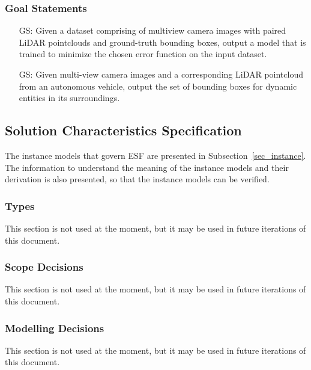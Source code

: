 \documentclass[12pt]{article}
\newcounter{goalnum} %
\newcommand{\ProjectName}{ESF }
\begin{document}
\subsubsection{Goal Statements}
\begin{itemize}

\item[GS\refstepcounter{goalnum}\thegoalnum \label{goal:training}:] Given a dataset comprising of multiview 
camera images with paired LiDAR pointclouds and ground-truth bounding boxes, output a model that is trained
to minimize the chosen error function on the input dataset.

\item[GS\refstepcounter{goalnum}\thegoalnum \label{goal:inference}:] Given multi-view camera images and a 
corresponding LiDAR pointcloud from an autonomous vehicle, output the set of bounding boxes for dynamic entities
in its surroundings.

\end{itemize}

\subsection{Solution Characteristics Specification}

The instance models that govern \ProjectName are presented in
Subsection~\ref{sec_instance}.  The information to understand the meaning of the
instance models and their derivation is also presented, so that the instance
models can be verified.

\subsubsection{Types}

This section is not used at the moment, but it may be used in future iterations of this document.

\subsubsection{Scope Decisions}

This section is not used at the moment, but it may be used in future iterations of this document.
\subsubsection{Modelling Decisions}

This section is not used at the moment, but it may be used in future iterations of this document.
\end{document}
